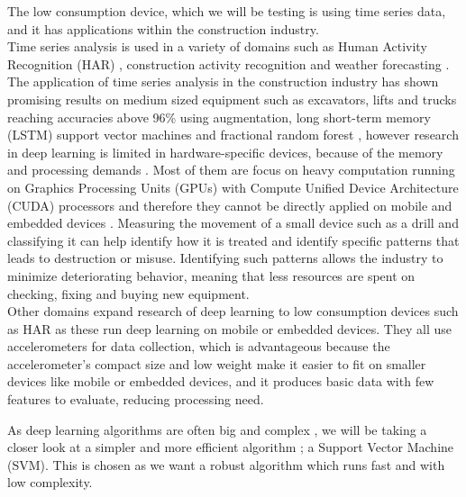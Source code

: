 The low consumption device, which we will be testing is using time series data, and it has applications within the construction industry.\\
Time series analysis is used in a variety of domains such as Human Activity Recognition (HAR) \cite{HumanActivityrecognitionAccelerometer}, construction activity recognition \cite{ConstructionRecognitionFractionalRandomForest}\cite{timeseriesDataAugmentationConstruction} and weather forecasting \cite{weatherForecastTimeSeries}.
The application of time series analysis in the construction industry has shown promising results on medium sized equipment such as excavators, lifts and trucks reaching accuracies above 96\% \cite{timeseriesDataAugmentationConstruction, constructionRecognitionMobileSensors,ConstructionRecognitionFractionalRandomForest} using augmentation, long short-term memory (LSTM) \cite{timeseriesDataAugmentationConstruction} support vector machines \cite{constructionRecognitionMobileSensors} and fractional random forest \cite{ConstructionRecognitionFractionalRandomForest}, however research in deep learning is limited in hardware-specific devices, because of the memory and processing demands \cite{deepLearningLowConsumptionStateOfTheArt}. Most of them are focus on heavy computation running on Graphics Processing Units (GPUs) with Compute Unified Device Architecture (CUDA) processors and therefore they cannot be directly applied on mobile and embedded devices \cite{deepLearningLowConsumptionStateOfTheArt}. 
Measuring the movement of a small device such as a drill and classifying it can help identify how it is treated and identify specific patterns that leads to destruction or misuse. Identifying such patterns allows the industry to minimize deteriorating behavior, meaning that less resources are spent on checking, fixing and buying new equipment. \\ 
Other domains expand research of deep learning to low consumption devices such as HAR\cite{HumanActivityrecognitionAccelerometer, HARsignalprocessing, hybridHARSVMCNN} as these run deep learning on mobile or embedded devices. They all use accelerometers for data collection, which is advantageous because the accelerometer's compact size and low weight make it easier to fit on smaller devices like mobile or embedded devices, and it produces basic data with few features to evaluate, reducing processing need. 

As deep learning algorithms are often big and complex , we will be taking a closer look at a simpler and more efficient algorithm ; a Support Vector Machine (SVM). This is chosen as we want a robust algorithm which runs fast and with low complexity. 
